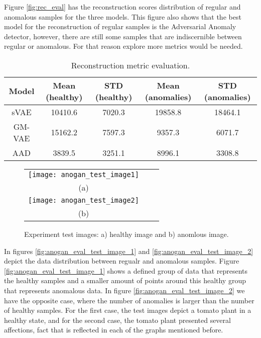 Figure \ref{fig:rec_eval} has the reconstruction scores distribution of regular and anomalous samples for the three models. This figure also shows that the best model for the reconstruction of regular samples is the Adversarial Anomaly detector, however, there are still some samples that are indiscernible between regular or anomalous. For that reason explore more metrics would be needed.

\begin{table}[htb]
    \caption[Reconstruction metric evaluation]{Reconstruction metric evaluation.}
    \label{table:rec_eval}
    \centering
    \begin{tabular}{ c c c c c }
        \hline
        Model & Mean (healthy) & STD (healthy) & Mean (anomalies) & STD (anomalies) \\
        \hline
        sVAE & 10410.6 & 7020.3 & 19858.8 & 18464.1 \\
        GM-VAE & 15162.2 & 7597.3 & 9357.3 & 6071.7 \\
        AAD & 3839.5 & 3251.1 & 8996.1 & 3308.8 \\
        \hline
    \end{tabular}
\end{table}

\begin{figure}[H]
\begin{minipage}{\linewidth}
  \centering
  \begin{tabular}{ccc}
  \texttt{[image: anogan\_test\_image1]} \\
  (a) \\ 
  \texttt{[image: anogan\_test\_image2]} \\
  (b) \\
  \end{tabular}
  \end{minipage}
\caption[Experiment test images]{Experiment test images: a) healthy image and b) anomlous image.}
\label{fig:test_images}
\end{figure}

In figures \ref{fig:anogan_eval_test_image_1} and \ref{fig:anogan_eval_test_image_2} depict the data distribution between regualr and anomalous samples. Figure \ref{fig:anogan_eval_test_image_1} shows a defined group of data that represents the healthy samples and a smaller amount of points around this healthy group that represents anomalous data. In figure \ref{fig:anogan_eval_test_image_2} we have the opposite case, where the number of anomalies is larger than the number of healthy samples. For the first case, the test images depict a tomato plant in a healthy state, and for the second case, the tomato plant presented several affections, fact that is reflected in each of the graphs mentioned before.

